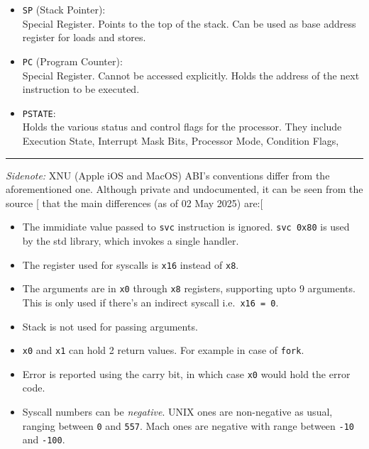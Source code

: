 \documentclass[a4paper, nobind]{templates/ociamthesis}
\providecommand{\tightlist}{%
  \setlength{\itemsep}{0pt}\setlength{\parskip}{0pt}}
\begin{document}
\begin{itemize}
  (Non-volatile) Holds the return address of a function call.
  Can be used, but value must be restored before returning.
\item
  \texttt{SP} (Stack Pointer):\\
  Special Register. Points to the top of the stack.
  Can be used as base address register for loads and stores.
\item
  \texttt{PC} (Program Counter):\\
  Special Register. Cannot be accessed explicitly.
  Holds the address of the next instruction to be executed.
\item
  \texttt{PSTATE}:\\
  Holds the various status and control flags for the processor.
  They include Execution State, Interrupt Mask Bits, Processor Mode, Condition Flags,
\end{itemize}

\begin{center}\rule{0.5\linewidth}{0.5pt}\end{center}

\emph{Sidenote:} XNU (Apple iOS and MacOS) ABI's conventions differ from the aforementioned one.
Although private and undocumented, it can be seen from the source {[}\citeproc{ref-apple-oss}{14}{]} that
the main differences (as of 02 May 2025) are:{[}\citeproc{ref-so-xnu-abi}{24}{]}

\begin{itemize}
\tightlist
\item
  The immidiate value passed to \texttt{svc} instruction is ignored. \texttt{svc\ 0x80} is used
  by the std library, which invokes a single handler.
\item
  The register used for syscalls is \texttt{x16} instead of \texttt{x8}.
\item
  The arguments are in \texttt{x0} through \texttt{x8} registers, supporting upto 9 arguments.
  This is only used if there's an indirect syscall i.e.~\texttt{x16\ =\ 0}.
\item
  Stack is not used for passing arguments.
\item
  \texttt{x0} and \texttt{x1} can hold 2 return values. For example in case of \texttt{fork}.
\item
  Error is reported using the carry bit, in which case \texttt{x0} would hold
  the error code.
\item
  Syscall numbers can be \emph{negative}.
  UNIX ones are non-negative as usual, ranging between \texttt{0} and \texttt{557}.
  Mach ones are negative with range between \texttt{-10} and \texttt{-100}.
\end{itemize}
\end{document}
